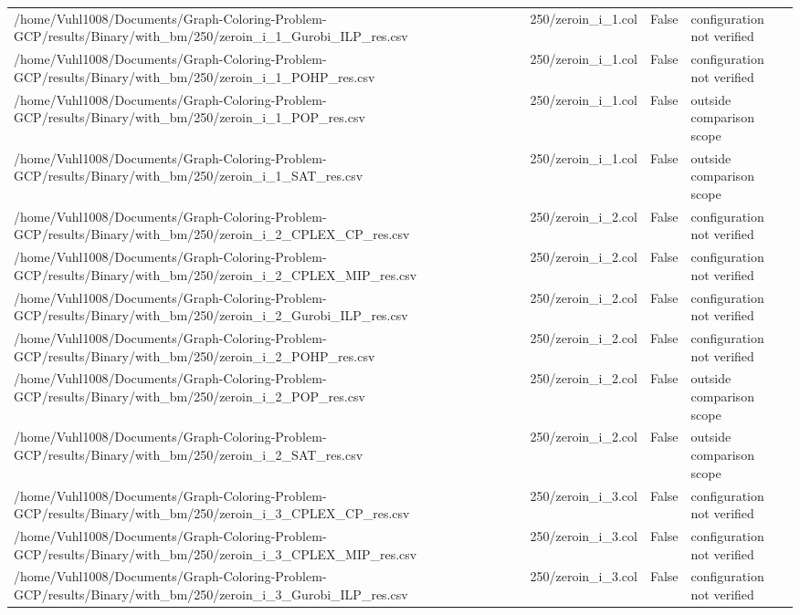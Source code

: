 \begin{table}[htbp]
\begin{tabular}{llll}
/home/Vuhl1008/Documents/Graph-Coloring-Problem-GCP/results/Binary/with\_bm/250/zeroin\_i\_1\_Gurobi\_ILP\_res.csv & 250/zeroin\_i\_1.col & False & configuration not verified \\
/home/Vuhl1008/Documents/Graph-Coloring-Problem-GCP/results/Binary/with\_bm/250/zeroin\_i\_1\_POHP\_res.csv & 250/zeroin\_i\_1.col & False & configuration not verified \\
/home/Vuhl1008/Documents/Graph-Coloring-Problem-GCP/results/Binary/with\_bm/250/zeroin\_i\_1\_POP\_res.csv & 250/zeroin\_i\_1.col & False & outside comparison scope \\
/home/Vuhl1008/Documents/Graph-Coloring-Problem-GCP/results/Binary/with\_bm/250/zeroin\_i\_1\_SAT\_res.csv & 250/zeroin\_i\_1.col & False & outside comparison scope \\
/home/Vuhl1008/Documents/Graph-Coloring-Problem-GCP/results/Binary/with\_bm/250/zeroin\_i\_2\_CPLEX\_CP\_res.csv & 250/zeroin\_i\_2.col & False & configuration not verified \\
/home/Vuhl1008/Documents/Graph-Coloring-Problem-GCP/results/Binary/with\_bm/250/zeroin\_i\_2\_CPLEX\_MIP\_res.csv & 250/zeroin\_i\_2.col & False & configuration not verified \\
/home/Vuhl1008/Documents/Graph-Coloring-Problem-GCP/results/Binary/with\_bm/250/zeroin\_i\_2\_Gurobi\_ILP\_res.csv & 250/zeroin\_i\_2.col & False & configuration not verified \\
/home/Vuhl1008/Documents/Graph-Coloring-Problem-GCP/results/Binary/with\_bm/250/zeroin\_i\_2\_POHP\_res.csv & 250/zeroin\_i\_2.col & False & configuration not verified \\
/home/Vuhl1008/Documents/Graph-Coloring-Problem-GCP/results/Binary/with\_bm/250/zeroin\_i\_2\_POP\_res.csv & 250/zeroin\_i\_2.col & False & outside comparison scope \\
/home/Vuhl1008/Documents/Graph-Coloring-Problem-GCP/results/Binary/with\_bm/250/zeroin\_i\_2\_SAT\_res.csv & 250/zeroin\_i\_2.col & False & outside comparison scope \\
/home/Vuhl1008/Documents/Graph-Coloring-Problem-GCP/results/Binary/with\_bm/250/zeroin\_i\_3\_CPLEX\_CP\_res.csv & 250/zeroin\_i\_3.col & False & configuration not verified \\
/home/Vuhl1008/Documents/Graph-Coloring-Problem-GCP/results/Binary/with\_bm/250/zeroin\_i\_3\_CPLEX\_MIP\_res.csv & 250/zeroin\_i\_3.col & False & configuration not verified \\
/home/Vuhl1008/Documents/Graph-Coloring-Problem-GCP/results/Binary/with\_bm/250/zeroin\_i\_3\_Gurobi\_ILP\_res.csv & 250/zeroin\_i\_3.col & False & configuration not verified \\

\end{tabular}
\end{table}
